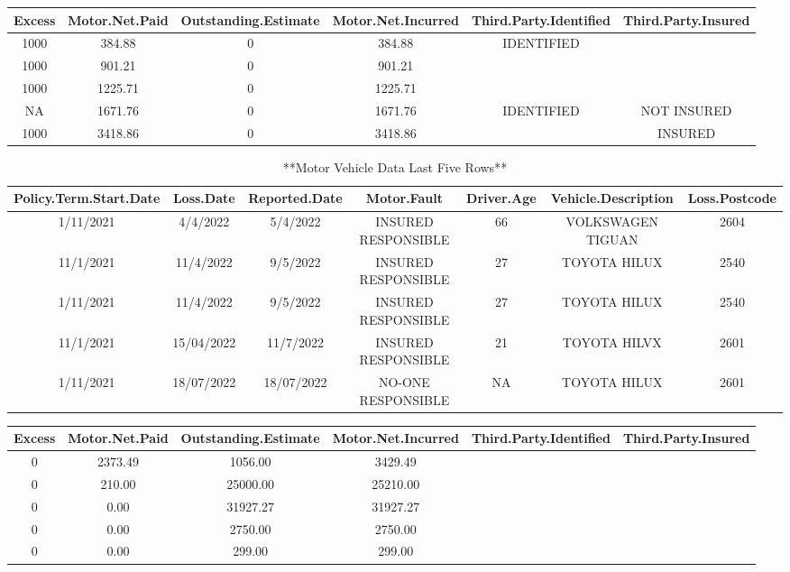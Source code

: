 \documentclass[
]{book}
\begin{document}
\begin{tabular}{c|c|c|c|c|c}
\hline
Excess & Motor.Net.Paid & Outstanding.Estimate & Motor.Net.Incurred & Third.Party.Identified & Third.Party.Insured\\
\hline
1000 & 384.88 & 0 & 384.88 & IDENTIFIED & \\
\hline
1000 & 901.21 & 0 & 901.21 &  & \\
\hline
1000 & 1225.71 & 0 & 1225.71 &  & \\
\hline
NA & 1671.76 & 0 & 1671.76 & IDENTIFIED & NOT INSURED\\
\hline
1000 & 3418.86 & 0 & 3418.86 &  & INSURED\\
\hline
\end{tabular}

\begin{table}

\caption{\label{tab:PrintNumAuto}**Motor Vehicle Data Last Five Rows**}
\centering
\begin{tabular}[t]{c|c|c|c|c|c|c}
\hline
Policy.Term.Start.Date & Loss.Date & Reported.Date & Motor.Fault & Driver.Age & Vehicle.Description & Loss.Postcode\\
\hline
1/11/2021 & 4/4/2022 & 5/4/2022 & INSURED RESPONSIBLE & 66 & VOLKSWAGEN TIGUAN & 2604\\
\hline
11/1/2021 & 11/4/2022 & 9/5/2022 & INSURED RESPONSIBLE & 27 & TOYOTA HILUX & 2540\\
\hline
1/11/2021 & 11/4/2022 & 9/5/2022 & INSURED RESPONSIBLE & 27 & TOYOTA HILUX & 2540\\
\hline
11/1/2021 & 15/04/2022 & 11/7/2022 & INSURED RESPONSIBLE & 21 & TOYOTA HILVX & 2601\\
\hline
1/11/2021 & 18/07/2022 & 18/07/2022 & NO-ONE RESPONSIBLE & NA & TOYOTA HILUX & 2601\\
\hline
\end{tabular}
\end{table}

\begin{tabular}{c|c|c|c|c|c}
\hline
Excess & Motor.Net.Paid & Outstanding.Estimate & Motor.Net.Incurred & Third.Party.Identified & Third.Party.Insured\\
\hline
0 & 2373.49 & 1056.00 & 3429.49 &  & \\
\hline
0 & 210.00 & 25000.00 & 25210.00 &  & \\
\hline
0 & 0.00 & 31927.27 & 31927.27 &  & \\
\hline
0 & 0.00 & 2750.00 & 2750.00 &  & \\
\hline
0 & 0.00 & 299.00 & 299.00 &  & \\
\hline
\end{tabular}
\end{document}
